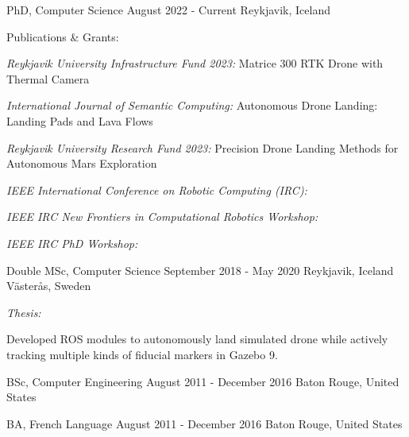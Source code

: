 

\begin{cventries}

  \cventry
    {PhD, Computer Science}
    {August 2022 - Current}
    {\hir}
    {Reykjavik, Iceland}
    {
    \vspace{-3mm}
    \begin{flushleft}
	    Publications \& Grants:
    \end{flushleft}
      \vspace{2mm}
      \begin{cvitems}
      \item {\emph{Reykjavik University Infrastructure Fund 2023:} Matrice 300 RTK Drone with Thermal Camera}
      \item {\emph{International Journal of Semantic Computing:} Autonomous Drone Landing: Landing Pads and Lava Flows}
      \item {\emph{Reykjavik University Research Fund 2023:} Precision Drone Landing Methods for Autonomous Mars Exploration}
      \item {\emph{IEEE International Conference on Robotic Computing (IRC):} }
        \item {\emph{IEEE IRC New Frontiers in Computational Robotics Workshop:} }
        \item {\emph{IEEE IRC PhD Workshop:} }
      \end{cvitems}
    }


  \doubleheadercventry
    {Double MSc, Computer Science} %
    {September 2018 - May 2020} %
    {\hir} %
    {Reykjavik, Iceland} %
    {\mdh}
    {Västerås, Sweden}
    {
      \begin{cvitems} %
        \item {\emph{Thesis:} } 
	\item Developed ROS modules to autonomously land simulated drone while actively tracking multiple kinds of fiducial markers in Gazebo 9.
      \end{cvitems}
    }
    
  \cventrywithoutdescription
    {BSc, Computer Engineering}
    {August 2011 - December 2016}
    {\lsu}
    {Baton Rouge, United States}

  \cventrywithoutdescription
    {BA, French Language}
    {August 2011 - December 2016}
    {\lsu}
    {Baton Rouge, United States}
\end{cventries}
